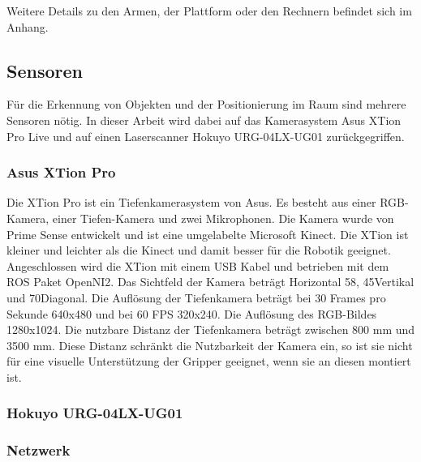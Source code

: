 Weitere Details zu den Armen, der Plattform oder den Rechnern befindet sich im Anhang.%

\subsection{Sensoren}
Für die Erkennung von Objekten und der Positionierung im Raum sind mehrere Sensoren nötig. In dieser Arbeit wird dabei auf das Kamerasystem Asus XTion Pro Live und auf einen Laserscanner Hokuyo URG-04LX-UG01 zurückgegriffen.

\subsubsection{Asus XTion Pro}
Die XTion Pro ist ein Tiefenkamerasystem von Asus. Es besteht aus einer RGB-Kamera, einer Tiefen-Kamera und zwei Mikrophonen. Die Kamera wurde von Prime Sense entwickelt und ist eine umgelabelte Microsoft Kinect. Die XTion ist kleiner und leichter als die Kinect und damit besser für die Robotik geeignet. Angeschlossen wird die XTion mit einem USB Kabel und betrieben mit dem ROS Paket OpenNI2. Das Sichtfeld der Kamera beträgt Horizontal 58\textdegree, 45\textdegree Vertikal und 70\textdegree Diagonal. Die Auflösung der Tiefenkamera beträgt bei 30 Frames pro Sekunde 640x480 und bei 60 FPS 320x240. Die Auflösung des RGB-Bildes 1280x1024. Die nutzbare Distanz der Tiefenkamera beträgt zwischen 800 mm und 3500 mm. Diese Distanz schränkt die Nutzbarkeit der Kamera ein, so ist sie nicht für eine visuelle Unterstützung der Gripper geeignet, wenn sie an diesen montiert ist.


\subsubsection{Hokuyo URG-04LX-UG01}
\subsubsection{Netzwerk}